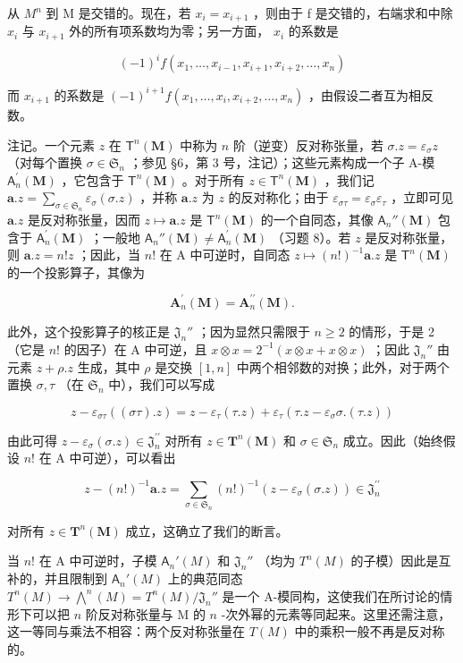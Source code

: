 从 \(M^{n}\) 到 M 是交错的。现在，若 \(x_{i} = x_{i+1}\) ，则由于 f 是交错的，右端求和中除 \(x_{i}\) 与 \(x_{i+1}\) 外的所有项系数均为零；另一方面， \(x_{i}\) 的系数是

\[
(- 1) ^ {i} f (x _ {1}, \dots , x _ {i - 1}, x _ {i + 1}, x _ {i + 2}, \dots , x _ {n})
\]

而 \(x_{i+1}\) 的系数是 \((-1)^{i+1}f(x_1, \ldots, x_i, x_{i+2}, \ldots, x_n)\) ，由假设二者互为相反数。

注记。一个元素 \(z\) 在 \(\mathsf{T}^n (\mathbf{M})\) 中称为 \(n\) 阶（逆变）反对称张量，若 \(\sigma .z = \varepsilon_{\sigma}z\) （对每个置换 \(\sigma \in \mathfrak{S}_n\) ；参见 §6，第 3 号，注记）；这些元素构成一个子 A-模 \(\mathsf{A}_n^\prime (\mathbf{M})\) ，它包含于 \(\mathsf{T}^n (\mathbf{M})\) 。对于所有 \(z\in \mathsf{T}^n (\mathbf{M})\) ，我们记 \(\pmb {a}.z = \sum_{\sigma \in \mathfrak{S}_n}\varepsilon_\sigma (\sigma .z)\) ，并称 \(\pmb {a}.z\) 为 \(z\) 的反对称化；由于 \(\varepsilon_{\sigma \tau} = \varepsilon_{\sigma}\varepsilon_{\tau}\) ，立即可见 \(\pmb {a}.z\) 是反对称张量，因而 \(z\mapsto \pmb {a}.z\) 是 \(\mathsf{T}^n (\mathbf{M})\) 的一个自同态，其像 \(\mathsf{A}_n''(\mathbf{M})\) 包含于 \(\mathsf{A}_n^\prime (\mathbf{M})\) ；一般地 \(\mathsf{A}_n''(\mathbf{M})\neq \mathsf{A}_n^\prime (\mathbf{M})\) （习题 8）。若 \(z\) 是反对称张量，则 \(\pmb {a}.z = n!z\) ；因此，当 \(n!\) 在 A 中可逆时，自同态 \(z\mapsto (n!)^{-1}\pmb {a}.z\) 是 \(\mathsf{T}^n (\mathbf{M})\) 的一个投影算子，其像为

\[
\mathbf {A} _ {n} ^ {\prime} (\mathbf {M}) = \mathbf {A} _ {n} ^ {\prime \prime} (\mathbf {M}).
\]

此外，这个投影算子的核正是 \(\mathfrak{J}_n''\) ；因为显然只需限于 \(n \geqslant 2\) 的情形，于是 2（它是 \(n!\) 的因子）在 A 中可逆，且 \(x \otimes x = 2^{-1}(x \otimes x + x \otimes x)\) ；因此 \(\mathfrak{J}_n''\) 由元素 \(z + \rho . z\) 生成，其中 \(\rho\) 是交换 \([1, n]\) 中两个相邻数的对换；此外，对于两个置换 \(\sigma, \tau\) （在 \(\mathfrak{S}_n\) 中），我们可以写成

\[
z - \varepsilon_ {\sigma \tau} ((\sigma \tau). z) = z - \varepsilon_ {\tau} (\tau . z) + \varepsilon_ {\tau} (\tau . z - \varepsilon_ {\sigma} \sigma . (\tau . z))
\]

由此可得 \(z - \varepsilon_{\sigma}(\sigma . z) \in \mathfrak{J}_{n}^{\prime \prime}\) 对所有 \(z \in \mathbf{T}^{n}(\mathbf{M})\) 和 \(\sigma \in \mathfrak{S}_{n}\) 成立。因此（始终假设 \(n!\) 在 A 中可逆），可以看出

\[
z - (n!) ^ {- 1} \boldsymbol {a}. z = \sum_ {\sigma \in \mathfrak {S} _ {n}} (n!) ^ {- 1} (z - \varepsilon_ {\sigma} (\sigma . z)) \in \mathfrak {J} _ {n} ^ {\prime \prime}
\]

对所有 \(z \in \mathbf{T}^n(\mathbf{M})\) 成立，这确立了我们的断言。

当 \(n!\) 在 A 中可逆时，子模 \(\mathsf{A}_n'(M)\) 和 \(\mathfrak{J}_n''\) （均为 \(T^n(M)\) 的子模）因此是互补的，并且限制到 \(\mathsf{A}_n'(M)\) 上的典范同态 \(T^n(M) \to \bigwedge^n(M) = T^n(M)/\mathfrak{J}_n''\) 是一个 A-模同构，这使我们在所讨论的情形下可以把 \(n\) 阶反对称张量与 M 的 \(n\) -次外幂的元素等同起来。这里还需注意，这一等同与乘法不相容：两个反对称张量在 \(T(M)\) 中的乘积一般不再是反对称的。

